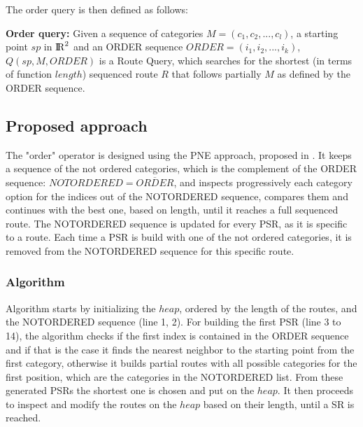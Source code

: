 The order query is then defined as follows: 

\textbf{Order query:} Given a sequence of categories $M = (c_1, c_2, ..., c_l)$, a starting point $sp$ in ${\rm I\!R}^2$ and an ORDER sequence $ORDER = (i_1, i_2, ..., i_k)$, $Q(sp, M, ORDER)$ is a Route Query, which searches for the shortest (in terms of function $length$) sequenced route $R$ that follows partially $M$ as defined by the ORDER sequence.


\subsection{Proposed approach} 
\label{sec:approachOrder}
The "order" operator is designed using the PNE approach, proposed in \cite{OSR}. It keeps a sequence of the not ordered categories, which is the complement of the ORDER sequence: $NOTORDERED = \overline{ORDER}$, and inspects progressively each category option for the indices out of the NOTORDERED sequence, compares them and continues with the best one, based on length, until it reaches a full sequenced route. The NOTORDERED sequence is updated for every PSR, as it is specific to a route. Each time a PSR is build with one of the not ordered categories, it is removed from the NOTORDERED sequence for this specific route.

\subsubsection{Algorithm}
\label{sec:algortihmOrder}
Algorithm \texttt{} starts by initializing the $heap$, ordered by the length of the routes, and the NOTORDERED sequence (line 1, 2). For building the first PSR (line 3 to 14), the algorithm checks if the first index is contained in the ORDER sequence and if that is the case it finds the nearest neighbor to the starting point from the first category, otherwise it builds partial routes with all possible categories for the first position, which are the categories in the NOTORDERED list. From these generated PSRs the shortest one is chosen and put on the $heap$. It then proceeds to inspect and modify the routes on the $heap$ based on their length, until a SR is reached. 

